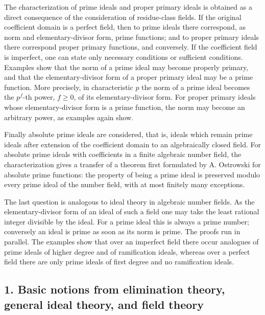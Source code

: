 \documentclass[11pt]{article}
\begin{document}
The characterization of prime ideals and proper primary ideals is obtained as a direct consequence of the consideration of residue-class fields. If the original coefficient domain is a perfect field, then to prime ideals there correspond, as norm and elementary-divisor form, prime functions; and to proper primary ideals there correspond proper primary functions, and conversely. If the coefficient field is imperfect, one can state only necessary conditions or sufficient conditions. Examples show that the norm of a prime ideal may become properly primary, and that the elementary-divisor form of a proper primary ideal may be a prime function. More precisely, in characteristic $p$ the norm of a prime ideal becomes the $p^f$-th power, $f\geq 0$, of its elementary-divisor form. For proper primary ideals whose elementary-divisor form is a prime function, the norm may become an arbitrary power, as examples again show.

Finally absolute prime ideals are considered, that is, ideals which remain prime ideals after extension of the coefficient domain to an algebraically closed field. For absolute prime ideals with coefficients in a finite algebraic number field, the characterization gives a transfer of a theorem first formulated by A. Ostrowski for absolute prime functions: the property of being a prime ideal is preserved modulo every prime ideal of the number field, with at most finitely many exceptions.

The last question is analogous to ideal theory in algebraic number fields. As the elementary-divisor form of an ideal of such a field one may take the least rational integer divisible by the ideal. For a prime ideal this is always a prime number; conversely an ideal is prime as soon as its norm is prime. The proofs run in parallel. The examples show that over an imperfect field there occur analogues of prime ideals of higher degree and of ramification ideals, whereas over a perfect field there are only prime ideals of first degree and no ramification ideals.

\subsection{1. Basic notions from elimination theory, general ideal theory, and field theory}
\end{document}

